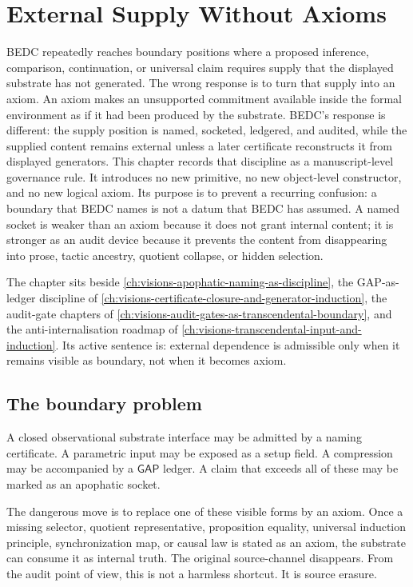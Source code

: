 \chapter{External Supply Without Axioms}
\label{ch:visions-external-supply-without-axioms}

BEDC repeatedly reaches boundary positions where a proposed inference, comparison, continuation, or universal claim requires supply that the displayed substrate has not generated. The wrong response is to turn that supply into an axiom. An axiom makes an unsupported commitment available inside the formal environment as if it had been produced by the substrate. BEDC's response is different: the supply position is named, socketed, ledgered, and audited, while the supplied content remains external unless a later certificate reconstructs it from displayed generators. This chapter records that discipline as a manuscript-level governance rule. It introduces no new primitive, no new object-level constructor, and no new logical axiom. Its purpose is to prevent a recurring confusion: a boundary that BEDC names is not a datum that BEDC has assumed. A named socket is weaker than an axiom because it does not grant internal content; it is stronger as an audit device because it prevents the content from disappearing into prose, tactic ancestry, quotient collapse, or hidden selection.

The chapter sits beside \autoref{ch:visions-apophatic-naming-as-discipline}, the GAP-as-ledger discipline of \autoref{ch:visions-certificate-closure-and-generator-induction}, the audit-gate chapters of \autoref{ch:visions-audit-gates-as-transcendental-boundary}, and the anti-internalisation roadmap of \autoref{ch:visions-transcendental-input-and-induction}. Its active sentence is: external dependence is admissible only when it remains visible as boundary, not when it becomes axiom.

\section{The boundary problem}
\label{sec:external-supply-boundary-problem}

A closed observational substrate interface may be admitted by a naming certificate. A parametric input may be exposed as a setup field. A compression may be accompanied by a $\mathsf{GAP}$ ledger. A claim that exceeds all of these may be marked as an apophatic socket.

The dangerous move is to replace one of these visible forms by an axiom. Once a missing selector, quotient representative, proposition equality, universal induction principle, synchronization map, or causal law is stated as an axiom, the substrate can consume it as internal truth. The original source-channel disappears. From the audit point of view, this is not a harmless shortcut. It is source erasure.

